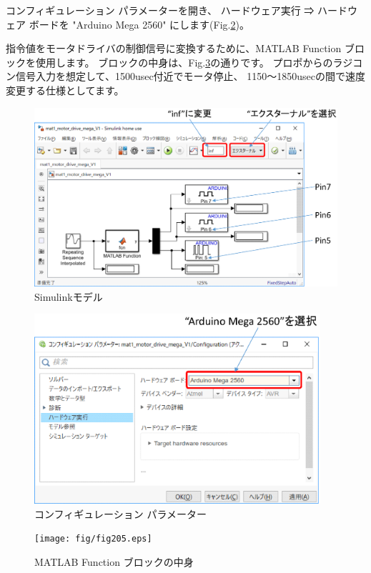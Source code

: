 コンフィギュレーション パラメーターを開き、
ハードウェア実行 ⇒ ハードウェア ボードを "Arduino Mega 2560" にします(Fig.\ref{fig204})。

指令値をモータドライバの制御信号に変換するために、MATLAB Function ブロックを使用します。
ブロックの中身は、Fig.\ref{fig205}の通りです。
プロポからのラジコン信号入力を想定して、1500usec付近でモータ停止、
1150～1850usecの間で速度変更する仕様としてます。

\begin{figure}[htbp]
\centering
\includegraphics[width=350pt]{fig/fig203.eps}
\caption{Simulinkモデル}
\label{fig203}
\end{figure}

\begin{figure}[htbp]
\centering
\includegraphics[width=300pt]{fig/fig204.eps}
\caption{コンフィギュレーション パラメーター}
\label{fig204}
\end{figure}

\begin{figure}[htbp]
\centering
\texttt{[image: fig/fig205.eps]}
\caption{MATLAB Function ブロックの中身}
\label{fig205}
\end{figure}


